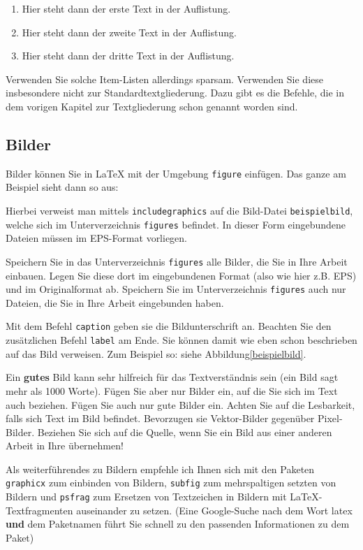 \documentclass[a4paper,twoside]{IEEEtran}
\begin{document}
 \begin{enumerate}
\item Hier steht dann der erste Text in der Auflistung.
\item Hier steht dann der zweite Text in der Auflistung.
\item Hier steht dann der dritte Text in der Auflistung.
\end{enumerate}

Verwenden Sie solche Item-Listen allerdings sparsam. Verwenden Sie diese insbesondere nicht zur Standardtextgliederung. Dazu gibt es die Befehle, die in dem vorigen Kapitel zur Textgliederung schon genannt worden sind.
 

\subsection{Bilder}

Bilder können Sie in LaTeX mit der Umgebung \texttt{figure} einfügen. Das ganze am Beispiel sieht dann so aus:


Hierbei verweist man mittels \texttt{includegraphics} auf die Bild-Datei \texttt{beispielbild}, welche sich im Unterverzeichnis \texttt{figures} befindet. In dieser Form eingebundene Dateien müssen im EPS-Format vorliegen.

Speichern Sie in das Unterverzeichnis \texttt{figures} alle Bilder, die Sie in Ihre Arbeit einbauen. Legen Sie diese dort im eingebundenen Format (also wie hier z.B. EPS) und im Originalformat ab. Speichern Sie im Unterverzeichnis \texttt{figures} auch nur Dateien, die Sie in Ihre Arbeit eingebunden haben.

Mit dem Befehl \texttt{caption} geben sie die Bildunterschrift an. Beachten Sie den zusätzlichen Befehl \texttt{label} am Ende. Sie können damit wie eben schon beschrieben auf das Bild verweisen. Zum Beispiel so: siehe Abbildung\ref{beispielbild}.

Ein \textbf{gutes} Bild kann sehr hilfreich für das Textverständnis sein (ein Bild sagt mehr als 1000 Worte). Fügen Sie aber nur Bilder ein, auf die Sie sich im Text auch beziehen. Fügen Sie auch nur gute Bilder ein. Achten Sie auf die Lesbarkeit, falls sich Text im Bild befindet. Bevorzugen sie Vektor-Bilder gegenüber Pixel-Bilder. Beziehen Sie sich auf die Quelle, wenn Sie ein Bild aus einer anderen Arbeit in Ihre übernehmen! 

Als weiterführendes zu Bildern empfehle ich Ihnen sich mit den Paketen \texttt{graphicx} zum einbinden von Bildern, \texttt{subfig} zum mehrspaltigen setzten von Bildern und \texttt{psfrag} zum Ersetzen von Textzeichen in Bildern mit LaTeX-Textfragmenten auseinander zu setzen. (Eine Google-Suche nach dem Wort latex \textbf{und} dem Paketnamen führt Sie schnell zu den passenden Informationen zu dem Paket)
\end{document}
